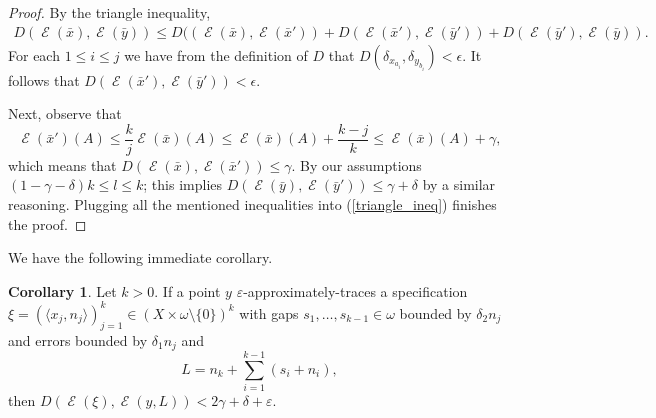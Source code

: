 \documentclass{amsart}
\theoremstyle{definition}
\newtheorem{lem}[thm]{Lemma}
\newtheorem{cor}[thm]{Corollary}
\newcommand{\cN}{\mathcal{N}}
\DeclareMathOperator{\Emp}{\mathcal{E}}%
\newcommand{\eps}{\varepsilon}
\newcommand{\N}{\mathbb{N}}
\newcommand{\co}[1]{{\color{red}#1}}
\begin{document}
\begin{proof}
By the triangle inequality,
\begin{align} \label{triangle_ineq}
D(\Emp(\bar{x}),\Emp(\bar{y})) \leq D((\Emp(\bar{x}), \Emp(\bar x'))
+D(\Emp(\bar x'), \Emp(\bar y'))+D(\Emp(\bar y'), \Emp(\bar{y})).
\end{align}
For each $1\leq i \leq j$ we have from the definition of $D$ that
$D(\delta_{x_{a_i}},\delta_{y_{b_i}})<\epsilon$. It follows that
$D(\Emp(\bar x'), \Emp(\bar y'))<\epsilon$.

Next, observe that
$$ \Emp(\bar{x}')(A) \le \frac{k}{j} \Emp(\bar{x})(A)
 \le \Emp(\bar{x})(A) + \frac{k-j}{k}
 \le \Emp(\bar{x})(A) + \gamma,
$$
which means that $D(\Emp(\bar{x}), \Emp(\bar x'))\leq \gamma$. By our assumptions $(1 - \gamma - \delta) k \le l \le k$; this implies $D(\Emp(\bar{y}), \Emp(\bar y')) \leq \gamma +  \delta$ by a similar reasoning. Plugging all the mentioned inequalities into (\ref{triangle_ineq}) finishes the proof.
\end{proof}



We have the following immediate corollary.

\begin{cor}Let $k>0$.
If a point $y$ $\eps$-approximately-traces a specification
$\xi=(\langle x_j,n_j\rangle)_{j=1}^k\in (X\times \omega\setminus\{0\})^k$
with gaps $s_1,\ldots,s_{k-1}\in \omega$ bounded by $\delta_2 n_j$
and errors bounded by $\delta_1 n_j$ and
\[
L=n_k+\sum_{i=1}^{k-1}(s_i+n_i),
\]
then $D(\Emp(\xi),\Emp(y,L))<2\gamma+\delta+\eps$.
\end{cor}
\end{document}
